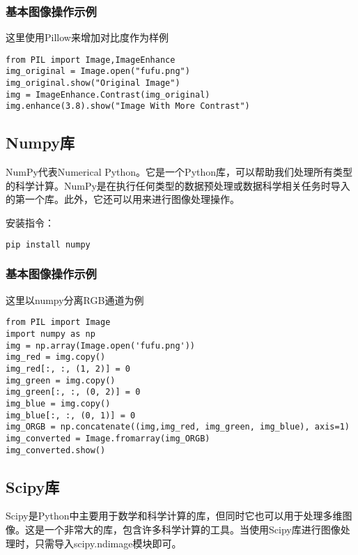 \documentclass[UTF8]{gyh}
\begin{document}
\subsubsection{基本图像操作示例}

这里使用Pillow来增加对比度作为样例

\begin{lstlisting}
from PIL import Image,ImageEnhance
img_original = Image.open("fufu.png")
img_original.show("Original Image")
img = ImageEnhance.Contrast(img_original)
img.enhance(3.8).show("Image With More Contrast")

\end{lstlisting}


\subsection{Numpy库}

NumPy代表Numerical Python。它是一个Python库，可以帮助我们处理所有类型的科学计算。NumPy是在执行任何类型的数据预处理或数据科学相关任务时导入的第一个库。此外，它还可以用来进行图像处理操作。

安装指令：
\begin{lstlisting}[language=bash]
pip install numpy
\end{lstlisting}

\subsubsection{基本图像操作示例}

这里以numpy分离RGB通道为例

\begin{lstlisting}
from PIL import Image
import numpy as np
img = np.array(Image.open('fufu.png'))
img_red = img.copy()
img_red[:, :, (1, 2)] = 0
img_green = img.copy()
img_green[:, :, (0, 2)] = 0
img_blue = img.copy()
img_blue[:, :, (0, 1)] = 0
img_ORGB = np.concatenate((img,img_red, img_green, img_blue), axis=1)
img_converted = Image.fromarray(img_ORGB)
img_converted.show()
\end{lstlisting}


\subsection{Scipy库}

Scipy是Python中主要用于数学和科学计算的库，但同时它也可以用于处理多维图像。这是一个非常大的库，包含许多科学计算的工具。当使用Scipy库进行图像处理时，只需导入scipy.ndimage模块即可。
\end{document}
